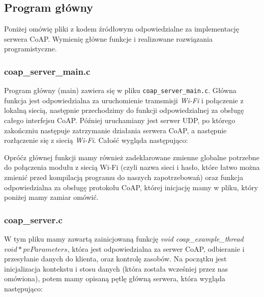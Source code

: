 \subsection{Program główny}

Poniżej omówię pliki z kodem źródłowym odpowiedzialne za implementację serwera CoAP. Wymienię główne funkcje i realizowane rozwiązania programistyczne.

\subsubsection{coap\_server\_main.c}

Program główny (main) zawiera się w pliku \verb|coap_server_main.c|. Główna funkcja jest odpowiedzialna za uruchomienie tramsmisji \textit{Wi-Fi} i połączenie z lokalną siecią, następnie przechodzimy do funkcji odpowiedzialnej za obsługę całego interfejsu CoAP. Później uruchamiany jest serwer UDP, po którego zakończniu następuje zatrzymanie działania serwera CoAP, a następnie rozłączenie się z siecią \textit{Wi-Fi}. Całość wygląda następująco:

\vspace{0.5cm}

\vspace{0.5cm}

Opróćz głównej funkcji mamy również zadeklarowane zmienne globalne potrzebne do połączenia modułu z siecią Wi-Fi (czyli nazwa sieci i hasło, które łatwo można zmienić przed kompilacją programu do naszych zapotrzebowań) oraz funkcja odpowiedzialna za obsługę protokołu CoAP, której inicjację mamy w pliku, który poniżej mamy zamiar omówić.

\subsubsection{coap\_server.c}

W tym pliku mamy zawartą zainicjowaną funkcję \textit{void coap\_example\_thread\(void *pvParameters\)}, która jest odpowiedzialna za serwer CoAP, odbieranie i przesyłanie danych do klienta, oraz kontrolę zasobów. Na początku jest inicjalizacja kontekstu i stosu danych (która została wcześniej przez nas omówiona), potem mamy opisaną pętlę główną serwera, która wygląda następująco:

\vspace{0.5cm}

\vspace{0.5cm}


